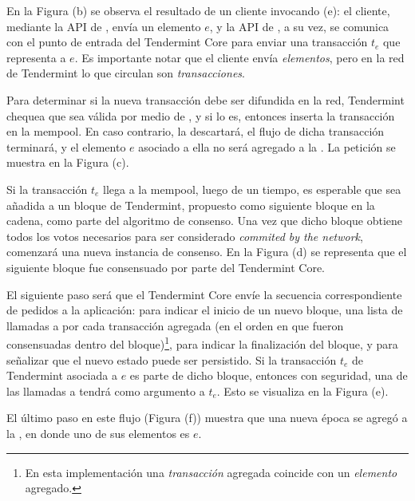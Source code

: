 En la Figura (b) se observa el resultado de un cliente invocando \Add(e): el cliente, mediante
la API de \setchain, envía un elemento $e$, y la API de \setchain, a su vez, se comunica con el
punto de entrada del Tendermint Core para enviar una transacción $t_e$ que representa a $e$.
Es importante notar que el cliente envía \textit{elementos}, pero en la red de Tendermint
lo que circulan son \textit{transacciones}.
%

Para determinar si la nueva transacción debe ser difundida en la red, Tendermint chequea que
sea válida por medio de \CheckTx, y si lo es, entonces inserta la transacción en la mempool.
En caso contrario, la descartará, el flujo de dicha transacción terminará, y el elemento $e$
asociado a ella no será agregado a la \setchain.
La petición \CheckTx se muestra en la Figura (c).

%
Si la transacción $t_e$ llega a la mempool, luego de un tiempo, es esperable que sea añadida a un
bloque de Tendermint, propuesto como siguiente bloque en la cadena, como parte del algoritmo de
consenso.
Una vez que dicho bloque obtiene todos los votos necesarios para ser considerado
\textit{commited by the network}, comenzará una nueva instancia de consenso. En la Figura (d)
se representa que el siguiente bloque fue consensuado por parte del Tendermint Core.

%
El siguiente paso será que el Tendermint Core envíe
la secuencia correspondiente de pedidos a la aplicación: \BeginBlock para indicar el inicio de
un nuevo bloque,
una lista de llamadas a \DeliverTx por cada transacción agregada (en el orden en que fueron
consensuadas dentro del bloque)\footnote{En esta implementación
una \textit{transacción} agregada coincide con un \textit{elemento} agregado.},
\EndBlock para indicar la finalización del bloque, y \Commit para señalizar que el nuevo estado
puede ser persistido.
%
Si la transacción $t_e$ de Tendermint asociada a $e$ es parte de dicho bloque,
entonces con seguridad, una de las llamadas a \DeliverTx tendrá como argumento a $t_e$.
Esto se visualiza en la Figura (e).

%
El último paso en este flujo (Figura (f)) muestra que una nueva época se agregó a la \setchain,
en donde uno de sus elementos es $e$.


